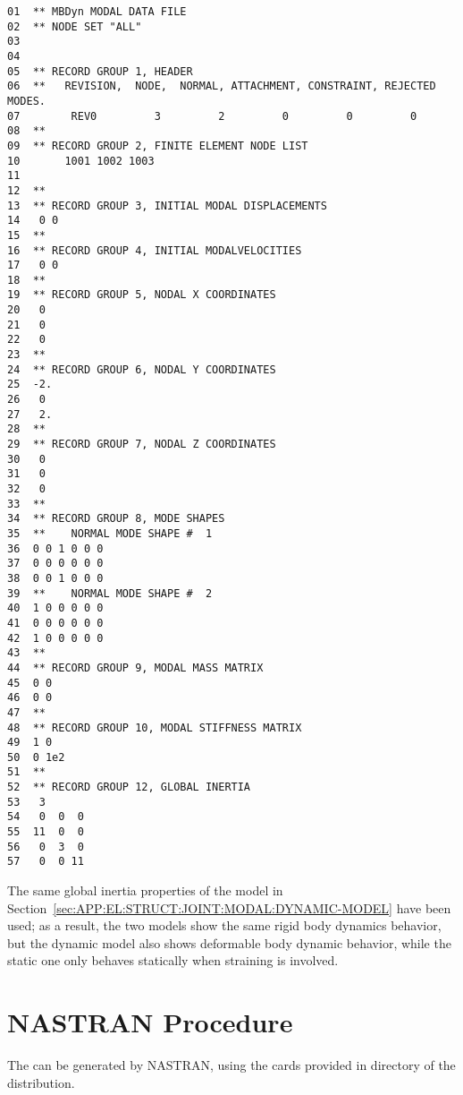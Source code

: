 \noindent
{\small
\begin{verbatim}
01  ** MBDyn MODAL DATA FILE
02  ** NODE SET "ALL" 
03    
04    
05  ** RECORD GROUP 1, HEADER
06  **   REVISION,  NODE,  NORMAL, ATTACHMENT, CONSTRAINT, REJECTED MODES.
07        REV0         3         2         0         0         0
08  **
09  ** RECORD GROUP 2, FINITE ELEMENT NODE LIST
10       1001 1002 1003
11  
12  **
13  ** RECORD GROUP 3, INITIAL MODAL DISPLACEMENTS
14   0 0
15  **
16  ** RECORD GROUP 4, INITIAL MODALVELOCITIES
17   0 0
18  **
19  ** RECORD GROUP 5, NODAL X COORDINATES
20   0
21   0
22   0
23  **
24  ** RECORD GROUP 6, NODAL Y COORDINATES
25  -2.
26   0
27   2.
28  **
29  ** RECORD GROUP 7, NODAL Z COORDINATES
30   0
31   0
32   0
33  **
34  ** RECORD GROUP 8, MODE SHAPES
35  **    NORMAL MODE SHAPE #  1
36  0 0 1 0 0 0
37  0 0 0 0 0 0
38  0 0 1 0 0 0
39  **    NORMAL MODE SHAPE #  2
40  1 0 0 0 0 0
41  0 0 0 0 0 0
42  1 0 0 0 0 0
43  **
44  ** RECORD GROUP 9, MODAL MASS MATRIX
45  0 0
46  0 0
47  **
48  ** RECORD GROUP 10, MODAL STIFFNESS MATRIX
49  1 0
50  0 1e2
51  **
52  ** RECORD GROUP 12, GLOBAL INERTIA
53   3
54   0  0  0
55  11  0  0
56   0  3  0
57   0  0 11
\end{verbatim}
}

The same global inertia properties of the model 
in Section~\ref{sec:APP:EL:STRUCT:JOINT:MODAL:DYNAMIC-MODEL} have been used;
as a result, the two models show the same rigid body dynamics behavior,
but the dynamic model also shows deformable body dynamic behavior, while
the static one only behaves statically when straining is involved.





\section{NASTRAN Procedure}
\label{sec:APP:EL:STRUCT:JOINT:MODAL:NASTRAN}

The  can be generated by NASTRAN, using
the  cards provided in directory  
of the distribution.

